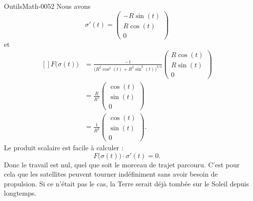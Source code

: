 \begin{corrige}{OutilsMath-0052}
    Nous avons
    \begin{equation}
        \sigma'(t)=\begin{pmatrix}
            -R\sin(t)    \\ 
            R\cos(t)    \\ 
            0    
        \end{pmatrix}
    \end{equation}
    et
    \begin{equation}
        \begin{aligned}[]
            F\big( \sigma(t) \big)&=\frac{ -1 }{ \big( R^2\cos^2(t)+R^2\sin^2(t) \big)^{3/2} }\begin{pmatrix}
                R\cos(t)    \\ 
                R\sin(t)    \\ 
                0    
            \end{pmatrix}\\
            &=
            \frac{ R }{ R^3 }\begin{pmatrix}
                \cos(t)    \\ 
                \sin(t)    \\ 
                0    
            \end{pmatrix}\\
            &=\frac{1}{ R^2 }\begin{pmatrix}
                \cos(t)    \\ 
                \sin(t)    \\ 
                0    
            \end{pmatrix}.
        \end{aligned}
    \end{equation}
    Le produit scalaire est facile à calculer :
    \begin{equation}
        F\big( \sigma(t) \big)\cdot \sigma'(t)=0.
    \end{equation}
    Donc le travail est nul, quel que soit le morceau de trajet parcouru. C'est pour cela que les satellites peuvent tourner indéfiniment sans avoir besoin de propulsion. Si ce n'était pas le cas, la Terre serait déjà tombée sur le Soleil depuis longtemps.

\end{corrige}
